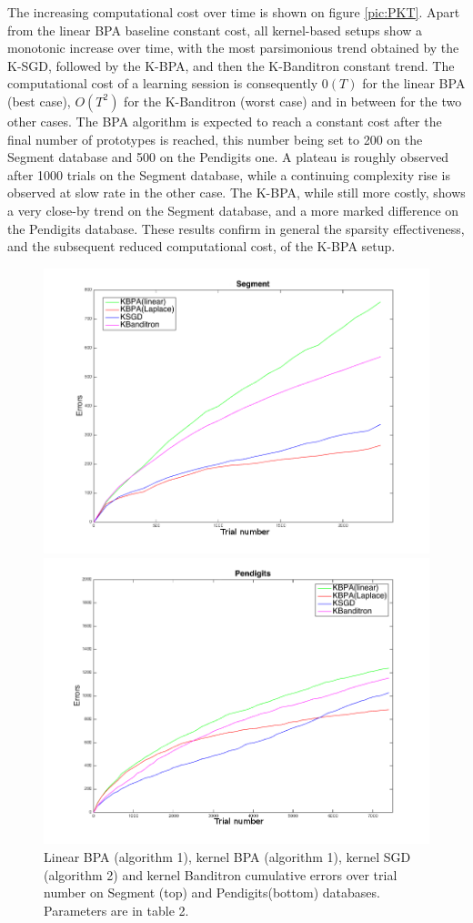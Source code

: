 \documentclass[preprint,12pt,authoryear]{elsarticle}
\begin{document}


The increasing computational cost over time is shown on figure \ref{pic:PKT}. Apart from the linear BPA baseline constant cost, all kernel-based setups show a monotonic increase over time, with the most parsimonious trend obtained by the K-SGD, followed by the K-BPA, and then the K-Banditron constant trend.  The computational cost of a learning session is consequently $0(T)$ for the linear BPA (best case), $O(T^2)$ for the K-Banditron (worst case) and in between for the two other cases. The BPA algorithm is expected to reach a constant cost after the final number of prototypes is reached, this number being set to 200 on the Segment database and 500  on the Pendigits one. A plateau is roughly observed after 1000 trials on the Segment database, while a continuing complexity rise is observed at slow rate in the other case. The K-BPA, while still more costly, shows a very close-by trend on the Segment database, and a more marked difference on the Pendigits database. These results confirm in general the sparsity effectiveness, and the subsequent reduced computational cost, of the K-BPA setup.


\begin{figure}[htp]
	
	\centerline{
	\includegraphics[width=.7\linewidth]{figs/Segment_kernel_CM.png}}
\centerline{
	\includegraphics[width=.7\linewidth]{figs/Pendigits_kernel_CM.png}}
	\caption{Linear BPA (algorithm 1), kernel BPA (algorithm 1), kernel SGD (algorithm 2)  and kernel Banditron cumulative errors over trial number on Segment  (top) and Pendigits(bottom)  databases. Parameters are in table 2.}
	\label{pic:PKCM}
\end{figure}
\end{document}
